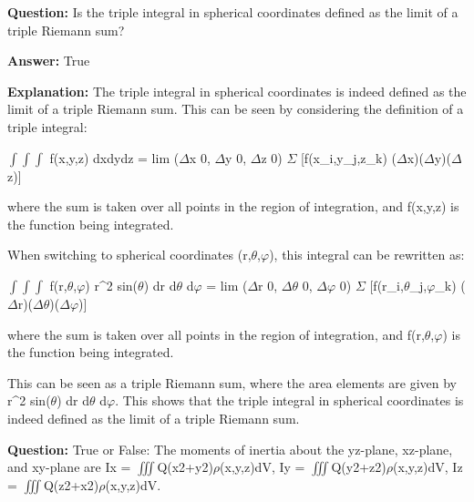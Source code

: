 \documentclass{article}
\begin{document}
                \vspace{0.5cm} 
        
            
                \textbf {Question:} Is the triple integral in spherical coordinates defined as the limit of a triple Riemann sum?
                
                \textbf{Answer:} True

                \textbf{Explanation:} The triple integral in spherical coordinates is indeed defined as the limit of a triple Riemann sum. This can be seen by considering the definition of a triple integral:

\ensuremath{\int}\ensuremath{\int}\ensuremath{\int} f(x,y,z) dxdydz = lim (\ensuremath{\Delta}x {\textrightarrow} 0, \ensuremath{\Delta}y {\textrightarrow} 0, \ensuremath{\Delta}z {\textrightarrow} 0) \ensuremath{\Sigma} [f(x\_i,y\_j,z\_k) {\texttimes} (\ensuremath{\Delta}x)(\ensuremath{\Delta}y)(\ensuremath{\Delta}z)]

where the sum is taken over all points in the region of integration, and f(x,y,z) is the function being integrated.

When switching to spherical coordinates (r,\ensuremath{\theta},\ensuremath{\varphi}), this integral can be rewritten as:

\ensuremath{\int}\ensuremath{\int}\ensuremath{\int} f(r,\ensuremath{\theta},\ensuremath{\varphi}) r{\textasciicircum}2 sin(\ensuremath{\theta}) dr d\ensuremath{\theta} d\ensuremath{\varphi} = lim (\ensuremath{\Delta}r {\textrightarrow} 0, \ensuremath{\Delta}\ensuremath{\theta} {\textrightarrow} 0, \ensuremath{\Delta}\ensuremath{\varphi} {\textrightarrow} 0) \ensuremath{\Sigma} [f(r\_i,\ensuremath{\theta}\_j,\ensuremath{\varphi}\_k) {\texttimes} (\ensuremath{\Delta}r)(\ensuremath{\Delta}\ensuremath{\theta})(\ensuremath{\Delta}\ensuremath{\varphi})]

where the sum is taken over all points in the region of integration, and f(r,\ensuremath{\theta},\ensuremath{\varphi}) is the function being integrated.

This can be seen as a triple Riemann sum, where the area elements are given by r{\textasciicircum}2 sin(\ensuremath{\theta}) dr d\ensuremath{\theta} d\ensuremath{\varphi}. This shows that the triple integral in spherical coordinates is indeed defined as the limit of a triple Riemann sum.
                
                \vspace{0.5cm} 
        
            
                \textbf {Question:} True or False: The moments of inertia about the yz-plane, xz-plane, and xy-plane are Ix = \ensuremath{\iiint}Q(x2+y2)\ensuremath{\rho}(x,y,z)dV, Iy = \ensuremath{\iiint}Q(y2+z2)\ensuremath{\rho}(x,y,z)dV, Iz = \ensuremath{\iiint}Q(z2+x2)\ensuremath{\rho}(x,y,z)dV.
                
\end{document}
